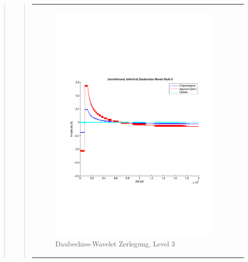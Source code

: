 \begin{quote}
\begin{quote}
\begin{center}
\begin{tabular}{ll}
\begin{minipage}{0.6\textwidth}
                    \end{minipage}
                    \begin{minipage}{0.6\textwidth}
    
                        \begin{figure}[H]
                            \label{fig:}
                            \includegraphics[scale=0.4, trim = 2cm 6cm 1cm
                            7.5cm,
                            clip]{./Bilder/Termin8/fehlerfrei_hochlaufen_Daubechies_Wavlet_lvl_3}
                            \caption{Daubechies-Wavelet Zerlegung, Level 3}
                        \end{figure}
                    \vspace{-1.5em}
    
                    \end{minipage}
    

\end{tabular}
\end{center}
\end{quote}
\end{quote}
